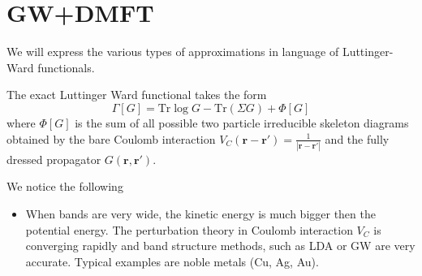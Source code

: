 \documentclass[usenames,letter,landscape,semhelv]{seminar}
\newcommand{\vr}{{\mathbf{r}}}
\renewcommand{\Tr}{\mathrm{Tr}}
\newcommand{\footcolor}{\Black}
\newcommand{\headboxcolor}{Yellow}
\newcommand{\headtext}{}
\newcommand{\DarkGreen}[1]{{\color{DarkGreen}{#1}}}
\newcommand{\Black}[1]{{\color{Black}{#1}}}
\begin{document}
\makeatletter
\def\pst@initoverlay#1{%
\pst@Verb{%
/BeginOL {dup (all) eq exch TheOL le or {IfVisible not {Visible
/IfVisible true def} if} {IfVisible {Invisible /IfVisible false def} if}
ifelse} def
\tx@InitOL /TheOL (#1) def}}
\makeatother

\renewcommand{\headtext}{QMC}
\renewcommand{\headboxcolor}{LightYellow}
\renewcommand{\footcolor}{\DarkGreen}

\begin{slide}
\begin{center}
 \end{center}

\vspace{4mm}

\section{GW+DMFT}

We will express the various types of approximations in language of
Luttinger-Ward functionals.

The exact Luttinger Ward functional takes the form
\begin{equation}
\Gamma[G] = \Tr\log G - \Tr(\Sigma G) + \Phi[G]  
\end{equation}
where $\Phi[G]$ is the sum of all possible two particle irreducible
skeleton diagrams obtained by the bare Coulomb interaction
$V_C(\vr-\vr')=\frac{1}{|\vr-\vr'|}$ and the fully dressed propagator
$G(\vr,\vr')$.


We notice the following 
\begin{itemize}

\item When bands are very wide, the kinetic energy is much bigger then
  the potential energy. The perturbation theory in Coulomb interaction
  $V_C$ is converging rapidly and band structure methods, such as LDA
  or GW are very accurate. Typical examples are noble metals (Cu, Ag, Au).
  

\end{itemize}
\end{slide}
\end{document}
